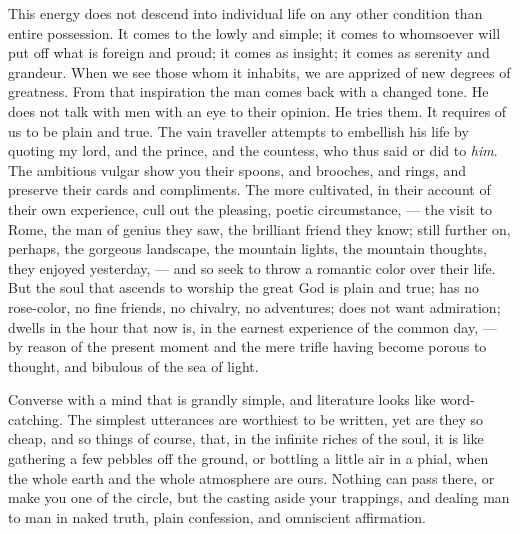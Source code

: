 \documentclass{article}
\begin{document}
This energy does not descend into individual life on any other condition than entire possession. It comes to the lowly and simple; it comes to whomsoever will put off what is foreign and proud; it comes as insight; it comes as serenity and grandeur. When we see those whom it inhabits, we are apprized of new degrees of greatness. From that inspiration the man comes back with a changed tone. He does not talk with men with an eye to their opinion. He tries them. It requires of us to be plain and true. The vain traveller attempts to embellish his life by quoting my lord, and the prince, and the countess, who thus said or did to \emph{him}. The ambitious vulgar show you their spoons, and brooches, and rings, and preserve their cards and compliments. The more cultivated, in their account of their own experience, cull out the pleasing, poetic circumstance, --- the visit to Rome, the man of genius they saw, the brilliant friend they know; still further on, perhaps, the gorgeous landscape, the mountain lights, the mountain thoughts, they enjoyed yesterday, --- and so seek to throw a romantic color over their life. But the soul that ascends to worship the great God is plain and true; has no rose-color, no fine friends, no chivalry, no adventures; does not want admiration; dwells in the hour that now is, in the earnest experience of the common day, --- by reason of the present moment and the mere trifle having become porous to thought, and bibulous of the sea of light.

Converse with a mind that is grandly simple, and literature looks like word-catching. The simplest utterances are worthiest to be written, yet are they so cheap, and so things of course, that, in the infinite riches of the soul, it is like gathering a few pebbles off the ground, or bottling a little air in a phial, when the whole earth and the whole atmosphere are ours. Nothing can pass there, or make you one of the circle, but the casting aside your trappings, and dealing man to man in naked truth, plain confession, and omniscient affirmation.
\end{document}

